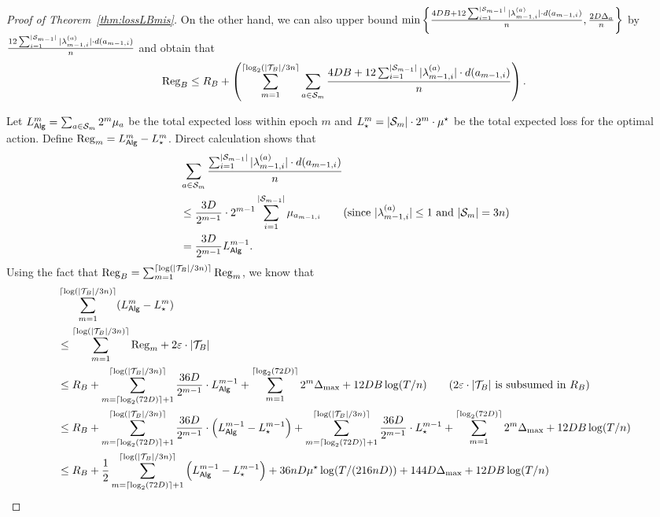 \begin{proof}[Proof of Theorem~\ref{thm:lossLBmis}]
    On the other hand, we can also upper bound $\min\left\{\frac{4DB+12\sum_{i=1}^{|{\mathcal{S}}_{m-1}|}|\lambda_{m-1,i}^{(a)}|\cdot d(a_{m-1,i})}{n}, \frac{2D\Delta_a}{n}\right\}$ by $\frac{12\sum_{i=1}^{|{\mathcal{S}}_{m-1}|}|\lambda_{m-1,i}^{(a)}|\cdot d(a_{m-1,i})}{n}$ and obtain that
    \begin{align*}
        {\mathrm{Reg}}_B \leq R_B + \left(\sum_{m=1}^{\lceil\log_2(|{\mathcal{T}}_B|/3n\rceil}\sum_{a\in{\mathcal{S}}_m}\frac{4DB+12\sum_{i=1}^{|{\mathcal{S}}_{m-1}|}|\lambda_{m-1,i}^{(a)}|\cdot d(a_{m-1,i})}{n}\right).
    \end{align*} 

    Let $L_{{\mathsf{Alg}}}^m=\sum_{a\in {\mathcal{S}}_m}2^m\mu_a$ be the total expected loss within epoch $m$ and $L_{\star}^m=|{\mathcal{S}}_m|\cdot 2^m\cdot\mu^\star$ be the total expected loss for the optimal action. Define ${\mathrm{Reg}}_m=L_{{\mathsf{Alg}}}^m-L_{\star}^m$. Direct calculation shows that
    \begin{align*}
        &\sum_{a\in \calS_m}\frac{\sum_{i=1}^{|\calS_{m-1}|}|\lambda_{m-1,i}^{(a)}|\cdot d(a_{m-1,i})}{n} \\
        &\leq \frac{3D}{2^{m-1}}\cdot 2^{m-1}\sum_{i=1}^{|\calS_{m-1}|}\mu_{a_{m-1,i}}\tag{since $|\lambda_{m-1,i}^{(a)}|\leq 1$ and $|\calS_m|=3n$}\\
        &= \frac{3D}{2^{m-1}}L_{\Alg}^{m-1}.
    \end{align*}
    Using the fact that ${\mathrm{Reg}}_B = \sum_{m=1}^{\lceil\log(|{\mathcal{T}}_B|/3n)\rceil}{\mathrm{Reg}}_m$, we know that
    \begin{align*}
        &\sum_{m=1}^{\lceil\log(|\calT_B|/3n)\rceil} (L_{\Alg}^m-L^m_{\star})\\
        &\leq \sum_{m=1}^{\lceil\log(|\calT_B|/3n)\rceil}\Reg_m + 2\epsilon\cdot |\calT_B|\\
        &\leq R_B + \sum_{m=\lceil\log_2(72D)\rceil+1}^{\lceil\log(|\calT_B|/3n)\rceil}\frac{36D}{2^{m-1}}\cdot L_{\Alg}^{m-1} + \sum_{m=1}^{\lceil\log_2(72D)\rceil}2^m\Delta_{\max} + 12DB\log(T/n) \tag{$2\epsilon\cdot |\calT_B|$ is subsumed in $R_B$}\\
        &\leq R_B + \sum_{m=\lceil\log_2(72D)\rceil+1}^{\lceil\log(|\calT_B|/3n)\rceil}\frac{36D}{2^{m-1}}\cdot \left(L_{\Alg}^{m-1}-L_{\star}^{m-1}\right) + \sum_{m=\lceil\log_2(72D)\rceil+1}^{\lceil\log(|\calT_B|/3n)\rceil}\frac{36D}{2^{m-1}}\cdot L_{\star}^{m-1} + \sum_{m=1}^{\lceil\log_2(72D)\rceil}2^m\Delta_{\max} +12DB\log(T/n)\\
        &\leq R_B + \frac{1}{2}\sum_{m=\lceil\log_2(72D)\rceil+1}^{\lceil\log(|\calT_B|/3n)\rceil} \left(L_{\Alg}^{m-1}-L_{\star}^{m-1}\right) + 36nD\mu^\star\log(T/(216nD))+144D\Delta_{\max} +12DB\log(T/n)\\

\end{align*}
\end{proof}
